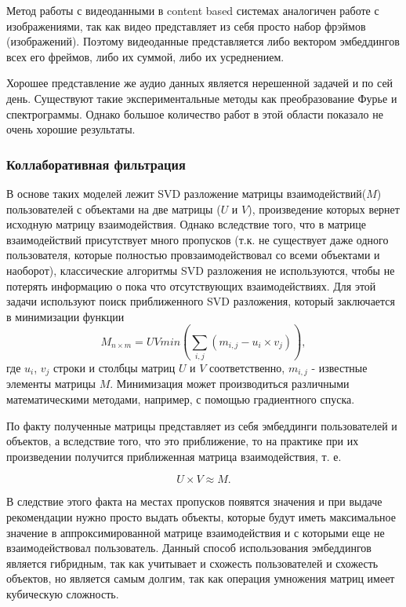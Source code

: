 \documentclass[bachelor, och, coursework]{SCWorks}
\begin{document}
Метод работы с видеоданными в content based системах аналогичен работе с изображениями, так как видео представляет
из себя просто набор фрэймов (изображений). Поэтому видеоданные представляется либо вектором эмбеддингов всех его фреймов,
либо их суммой, либо их усреднением.

Хорошее представление же аудио данных является нерешенной задачей и по сей день. Существуют такие экспериментальные
методы как преобразование Фурье и спектрограммы. Однако большое количество работ в этой области показало не очень
хорошие результаты.
\subsubsection{Коллаборативная фильтрация}
В основе таких моделей лежит SVD разложение матрицы взаимодействий($M$) пользователей с объектами на две матрицы ($U$ и $V$),
произведение которых вернет исходную матрицу взаимодействия. Однако вследствие того, что в матрице взаимодействий присутствует много
пропусков (т.к. не существует даже одного пользователя, которые полностью провзаимодействовал со всеми объектами
и наоборот), классические алгоритмы SVD разложения не используются, чтобы не потерять информацию о пока что отсутствующих
взаимодействиях. Для этой задачи используют поиск приближенного SVD разложения, который заключается в минимизации
функции 
\begin{equation}
    M_{n\times m} = UVmin(\sum_{i,j}(m_{i,j}-u_i \times v_j)),
\end{equation}
где $u_i$, $v_j$ строки и столбцы матриц $U$ и $V$ соответственно, $m_{i,j}$ - известные элементы матрицы $M$.
Минимизация может производиться различными математическими методами, например, с помощью градиентного спуска.

По факту полученные матрицы представляет из себя эмбеддинги пользователей и объектов, а вследствие того, что это приближение,
то на практике при их произведении получится приближенная матрица взаимодействия, т. е.

\begin{equation}
    U \times V \approx M.
\end{equation}

В следствие этого факта на местах пропусков появятся значения и при выдаче рекомендации нужно просто
выдать объекты, которые будут иметь максимальное значение в аппроксимированной матрице взаимодействия
и с которыми еще не взаимодействовал пользователь. Данный способ использования эмбеддингов является
гибридным, так как учитывает и схожесть пользователей и схожесть объектов, но является самым долгим,
так как операция умножения матриц имеет кубическую сложность.
\end{document}
